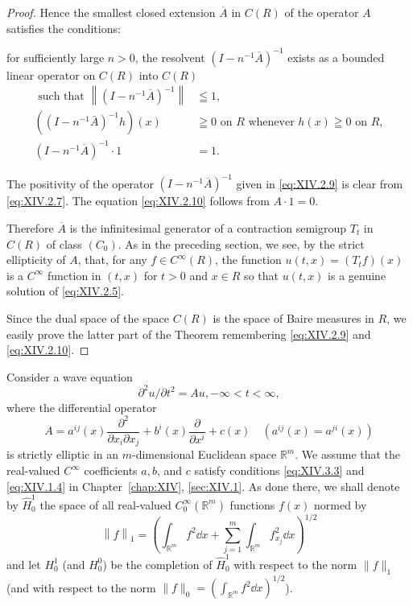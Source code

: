\begin{proof}
Hence the smallest closed extension $\overline{A}$ in $C(R)$ of the operator $A$ satisfies the conditions: 

for sufficiently large $n > 0$, the resolvent $(I - n^{-1}\overline{A})^{-1}$ 
exists as a bounded linear operator on $C(R)$ into $C(R)$ 
\begin{align}
\text{ such that } \left\| (I - n ^{-1} \overline {{A}}) ^{-1} \right\|& \leqq 1, \label{eq:XIV.2.8} \\
((I - n ^{-1} \bar {A}) ^{-1} h) (x)& \geqq 0 \text{ on } R \text{ whenever } h (x) \geqq 0 \text{ on } R, \label{eq:XIV.2.9} \\
(I - n ^{-1} \overline {{{A}}}) ^{-1} \cdot 1& = 1. \label{eq:XIV.2.10}
\end{align}

The positivity of the operator $(I - n^{-1}\overline{A})^{-1}$ given in \eqref{eq:XIV.2.9} is clear from \eqref{eq:XIV.2.7}. The equation \eqref{eq:XIV.2.10} follows from $A\cdot 1 = 0$. 

Therefore $\overline{A}$ is the infinitesimal generator of a contraction semigroup $T_{t}$ in $C(R)$ of class $(C_0)$. As in the preceding section, we see, by the strict ellipticity of $A$, that, for any $f \in C^{\infty}(R)$, the function $u(t,x) = (T_{t}f)(x)$ is a $C^{\infty}$ function in $(t,x)$ for $t > 0$ and $x \in R$ so that $u(t,x)$ is a genuine solution of \eqref{eq:XIV.2.5}. 

Since the dual space of the space $C(R)$ is the space of Baire measures in $R$, we easily prove the latter part of the Theorem remembering \eqref{eq:XIV.2.9} and \eqref{eq:XIV.2.10}. 
\end{proof}

\label{sec:XIV.3}

Consider a wave equation 
\begin{equation}\label{eq:XIV.3.1}
\partial^{2} u / \partial t ^{2} = A u, - \infty < t < \infty ,
\end{equation}
where the differential operator 
\begin{equation}\label{eq:XIV.3.2}
A = a ^{ij} (x) \frac {\partial^{2}}{\partial x _{i} \partial x _{j}} + b ^{i} (x) \frac {\partial}{\partial x ^{i}} + c (x) \quad \left(a ^{ij} (x) = a ^{ji} (x)\right)
\end{equation}
is strictly elliptic in an $m$-dimensional Euclidean space $\mathbb{R}^{m}$. We assume that the real-valued $C^{\infty}$ coefficients $a, b$, and $c$ satisfy conditions \eqref{eq:XIV.3.3} and \eqref{eq:XIV.1.4} in Chapter~\ref{chap:XIV}, \ref{sec:XIV.1}. As done there, we shall denote by $\hat{H}_{0}^{1}$ the space of all real-valued $C_{0}^{\infty}(\mathbb{R}^{m})$ functions $f(x)$ normed by 
\[
\left\| f \right\| _{1} = \left(\int_ {\mathbb{R}^{m}} f ^{2} \dd x + \sum\limits_{j=1} ^{m} \int_ {\mathbb{R}^{m}} f _ {x _{j}} ^{2} \dd x\right) ^{1/2}
\]
and let $H_0^1$ (and $H_0^0$) be the completion of $\hat{H}_0^1$ with respect to the norm $\|f\|_1$ (and with respect to the norm $\|f\|_0 = \left( \int_{\mathbb{R}^{m}} f^2 \dd x \right)^{1/2}$). 

